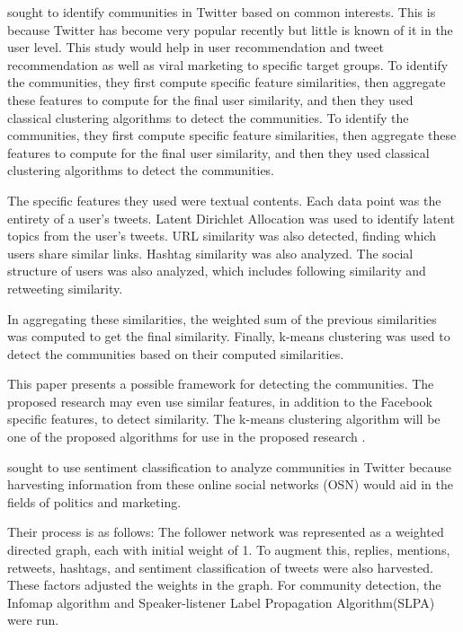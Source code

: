  sought to identify communities in Twitter based on common interests. This is because Twitter has become very popular recently but little is known of it in the user level. This study would help in user recommendation and tweet recommendation as well as viral marketing to specific target groups. To identify the communities, they first compute specific feature similarities, then aggregate these features to compute for the final user similarity, and then they used classical clustering algorithms to detect the communities. To identify the communities, they first compute specific feature similarities, then aggregate these features to compute for the final user similarity, and then they used classical clustering algorithms to detect the communities.

The specific features they used were textual contents. Each data point was the entirety of a user’s tweets. Latent Dirichlet Allocation was used to identify latent topics from the user’s tweets. URL similarity was also detected, finding which users share similar links. Hashtag similarity was also analyzed. The social structure of users was also analyzed, which includes following similarity and retweeting similarity. 

In aggregating these similarities, the weighted sum of the previous similarities was computed to get the final similarity. Finally, k-means clustering was used to detect the communities based on their computed similarities. 

This paper presents a possible framework for detecting the communities. The proposed research may even use similar features, in addition to the Facebook specific features, to detect similarity. The k-means clustering algorithm will be one of the proposed algorithms for use in the proposed research \cite{Zhang:2012}.

 sought to use sentiment classification to analyze communities in Twitter because harvesting information from these online social networks (OSN) would aid in the fields of politics and marketing. 

Their process is as follows: The follower network was represented as a weighted directed graph, each with initial weight of 1. To augment this, replies, mentions, retweets, hashtags, and sentiment classification of tweets were also harvested. These factors adjusted the weights in the graph. For community detection, the Infomap algorithm and Speaker-listener Label Propagation Algorithm(SLPA) were run. 

